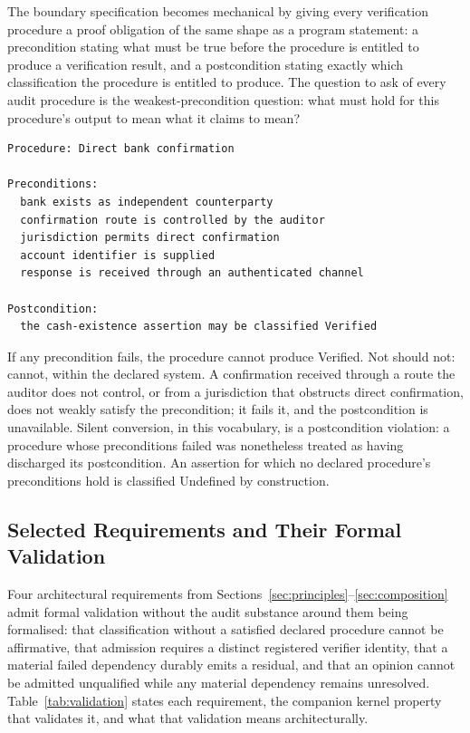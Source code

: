 \documentclass[11pt,a4paper]{article}
\theoremstyle{definition}
\theoremstyle{remark}
\begin{document}
The boundary specification becomes mechanical by giving every verification procedure a proof obligation of the same shape as a program statement: a precondition stating what must be true before the procedure is entitled to produce a verification result, and a postcondition stating exactly which classification the procedure is entitled to produce. The question to ask of every audit procedure is the weakest-precondition question: what must hold for this procedure's output to mean what it claims to mean?

\begin{lstlisting}[numbers=none, caption={Precondition and postcondition of direct bank confirmation.}, label={lst:precond}]
Procedure: Direct bank confirmation

Preconditions:
  bank exists as independent counterparty
  confirmation route is controlled by the auditor
  jurisdiction permits direct confirmation
  account identifier is supplied
  response is received through an authenticated channel

Postcondition:
  the cash-existence assertion may be classified Verified
\end{lstlisting}

If any precondition fails, the procedure cannot produce \textsf{Verified}. Not should not: cannot, within the declared system. A confirmation received through a route the auditor does not control, or from a jurisdiction that obstructs direct confirmation, does not weakly satisfy the precondition; it fails it, and the postcondition is unavailable. Silent conversion, in this vocabulary, is a postcondition violation: a procedure whose preconditions failed was nonetheless treated as having discharged its postcondition. An assertion for which no declared procedure's preconditions hold is classified \textsf{Undefined} by construction.

\subsection{Selected Requirements and Their Formal Validation}
\label{sec:theorems}

Four architectural requirements from Sections~\ref{sec:principles}--\ref{sec:composition} admit formal validation without the audit substance around them being formalised: that classification without a satisfied declared procedure cannot be affirmative, that admission requires a distinct registered verifier identity, that a material failed dependency durably emits a residual, and that an opinion cannot be admitted unqualified while any material dependency remains unresolved. Table~\ref{tab:validation} states each requirement, the companion kernel property that validates it, and what that validation means architecturally.
\end{document}
